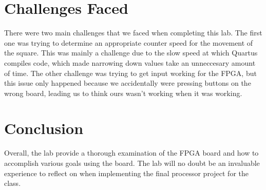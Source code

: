 \documentclass[letterpaper]{article} %
\begin{document}
\section{Challenges Faced}
    There were two main challenges that we faced when completing this lab. The first one was trying to determine an appropriate counter speed for the movement of the square. This was mainly a challenge due to the slow speed at which Quartus compiles code, which made narrowing down values take an unneccesary amount of time. The other challenge was trying to get input working for the FPGA, but this issue only happened because we accidentally were pressing buttons on the wrong board, leading us to think ours wasn't working when it was working.

\section{Conclusion}
        Overall, the lab provide a thorough examination of the FPGA board and how to accomplish various goals using the board. The lab will no doubt be an invaluable experience to reflect on when implementing the final processor project for the class.  
\end{document}
